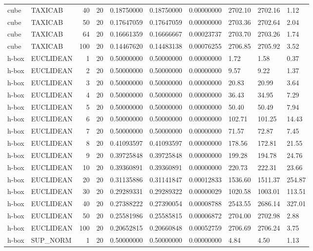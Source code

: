 \begin{longtable}{llrrllllll}
cube & TAXICAB & 40 & 20 & 0.18750000 & 0.18750000 & 0.00000000 & 2702.10 & 2702.16 & 1.12 \\
cube & TAXICAB & 50 & 20 & 0.17647059 & 0.17647059 & 0.00000000 & 2703.36 & 2702.64 & 2.04 \\
cube & TAXICAB & 64 & 20 & 0.16661359 & 0.16666667 & 0.00023737 & 2703.70 & 2703.26 & 1.74 \\
cube & TAXICAB & 100 & 20 & 0.14467620 & 0.14483138 & 0.00076255 & 2706.85 & 2705.92 & 3.52 \\
h-box & EUCLIDEAN & 1 & 20 & 0.50000000 & 0.50000000 & 0.00000000 & 1.72 & 1.58 & 0.37 \\
h-box & EUCLIDEAN & 2 & 20 & 0.50000000 & 0.50000000 & 0.00000000 & 9.57 & 9.22 & 1.37 \\
h-box & EUCLIDEAN & 3 & 20 & 0.50000000 & 0.50000000 & 0.00000000 & 20.83 & 20.99 & 3.64 \\
h-box & EUCLIDEAN & 4 & 20 & 0.50000000 & 0.50000000 & 0.00000000 & 36.43 & 34.95 & 7.29 \\
h-box & EUCLIDEAN & 5 & 20 & 0.50000000 & 0.50000000 & 0.00000000 & 50.40 & 50.49 & 7.94 \\
h-box & EUCLIDEAN & 6 & 20 & 0.50000000 & 0.50000000 & 0.00000000 & 102.71 & 101.25 & 14.43 \\
h-box & EUCLIDEAN & 7 & 20 & 0.50000000 & 0.50000000 & 0.00000000 & 71.57 & 72.87 & 7.45 \\
h-box & EUCLIDEAN & 8 & 20 & 0.41093597 & 0.41093597 & 0.00000000 & 178.56 & 172.81 & 21.55 \\
h-box & EUCLIDEAN & 9 & 20 & 0.39725848 & 0.39725848 & 0.00000000 & 199.28 & 194.78 & 24.76 \\
h-box & EUCLIDEAN & 10 & 20 & 0.39360891 & 0.39360891 & 0.00000000 & 220.73 & 222.31 & 23.66 \\
h-box & EUCLIDEAN & 20 & 20 & 0.31135886 & 0.31141847 & 0.00012833 & 1536.60 & 1511.37 & 254.87 \\
h-box & EUCLIDEAN & 30 & 20 & 0.29289331 & 0.29289322 & 0.00000029 & 1020.58 & 1003.01 & 113.51 \\
h-box & EUCLIDEAN & 40 & 20 & 0.27388222 & 0.27390054 & 0.00008788 & 2543.55 & 2686.14 & 327.01 \\
h-box & EUCLIDEAN & 50 & 20 & 0.25581986 & 0.25585815 & 0.00006872 & 2704.00 & 2702.98 & 2.88 \\
h-box & EUCLIDEAN & 100 & 20 & 0.20652815 & 0.20660848 & 0.00052759 & 2706.69 & 2706.24 & 3.75 \\
h-box & SUP\_NORM & 1 & 20 & 0.50000000 & 0.50000000 & 0.00000000 & 4.84 & 4.50 & 1.13 \\

\end{longtable}
